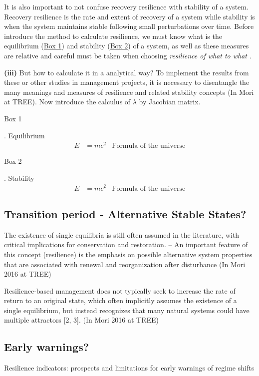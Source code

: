 It is also important to not confuse recovery resilience with stability of a system. Recovery resilience is the rate and extent of recovery of a system while stability is when the system maintains stable following small perturbations over time. Before introduce the method to calculate resilience, we must know what is the equilibrium (\hyperlink{box1}{Box 1}) and stability (\hyperlink{box2}{Box 2}) of a system, as well as these measures are relative and careful must be taken when choosing \textit{resilience of what to what} \citep{Carpenter2001}.

\textbf{(iii)} But how to calculate it in a analytical way?
To implement the results from these or other studies in management projects, it is necessary to disentangle the many meanings and measures of resilience and related stability concepts (In Mori at TREE).
Now introduce the calculus of $\lambda$ by Jacobian matrix.

\begin{tcolorbox}
\hypertarget{box1}{Box 1}. Equilibrium
\begin{align}
E &= mc^2 & \text{Formula of the universe}
\end{align}
\end{tcolorbox}

\begin{tcolorbox}
\hypertarget{box2}{Box 2}. Stability
\begin{align}
E &= mc^2 & \text{Formula of the universe}
\end{align}
\end{tcolorbox}

\subsection{Transition period - Alternative Stable States?}
The existence of single equilibria is still often assumed in the literature, with critical implications for conservation and restoration. -- An important feature of this concept (resilience) is the emphasis on possible alternative system properties that are associated with renewal and reorganization after disturbance (In Mori 2016 at TREE)

Resilience-based management does not typically seek to increase the rate of return to an original state, which often implicitly assumes the existence of a single equilibrium, but instead recognizes that many natural systems could have multiple attractors [2, 3]. (In Mori 2016 at TREE)

\subsection{Early warnings?}
Resilience indicators: prospects and limitations for early warnings of regime shifts

